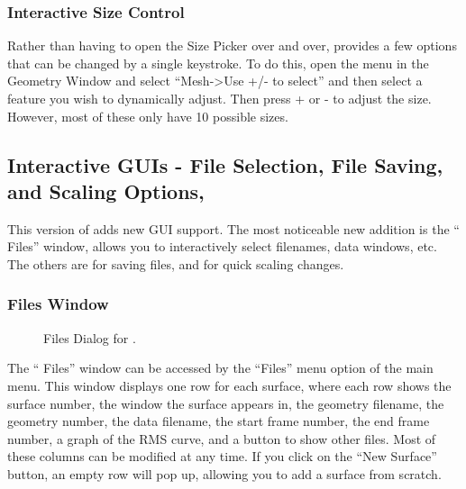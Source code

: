 \subsubsection{Interactive Size Control}
\label{sec:interactive-size}

Rather than having to open the Size Picker over and over, \map{} provides a
few options that can be changed by a single keystroke.  To do this, open
the menu in the Geometry Window and select ``Mesh->Use +/- to select'' and
then select a feature you wish to dynamically adjust.  Then press + or - to
adjust the size.  However, most of these only have 10 possible sizes.


\subsection{Interactive GUIs - File Selection, File Saving, and Scaling
  Options, \etc{}} 
\label{sec:interactive}

This version of \map{} adds new GUI support.  The most noticeable new
addition is the ``\map{} Files'' window, allows you to interactively select
filenames, data windows, etc.  The others are for saving files, and for
quick scaling changes.

\subsubsection{Files Window}
\label{sec:fileswindow}

\begin{figure}[htb]
  \begin{makeimage}
  \end{makeimage}
  \filesdialogone
  \caption{\label{fig:file1} Files Dialog for \map{}.}
\end{figure}

The ``\map{} Files'' window can be accessed by the ``Files'' menu option of
the main menu.  This window displays one row for each surface, where each
row shows the surface number, the window the surface appears in, the
geometry filename, the geometry number, the data filename, the start frame
number, the end frame number, a graph of the RMS curve, and a button to
show other files.  Most of these columns can be modified at any time.
If you click on the ``New Surface'' button, an empty row will pop up,
allowing you to add a surface from scratch.
 
